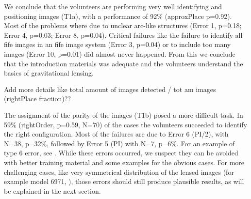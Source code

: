 



We conclude that the volunteers are performing very well identifying and positioning images (T1a), with a performance of 92\% (approxPlace p=0.92).
Most of the problems where due to unclear arc-like structures (Error 1, p=0.18; Error 4, p=0.03; Error 8, p=0.04).
Critical failures like the failure to identify all fife images in an fife image system (Error 3, p=0.04) or to include too many images (Error 10, p=0.01) did almost never happened.
From this we conclude that the introduction materials was adequate and the volunteers understand the basics of gravitational lensing.

 Add more details like total amount of images detected / tot am images (rightPlace fraction)??

The assignment of the parity of the images (T1b) posed a more difficult task.
In 59\% (rightOrder, p=0.59, N=70) of the cases the volunteers succeeded to identify the right configuration.
Most of the failures are due to Error 6 (PI/2), with N=38, p=32\%, followed by Error 5 (PI) with N=7, p=6\%.
For an example of type 6 error, see .
While these errors occurred, we suspect they can be avoided with better training material and some examples for the obvious cases.
For more challenging cases, like very symmetrical distribution of the lensed images (for example model 6971, ), those errors should still produce plausible results, as will be explained in the next section.







